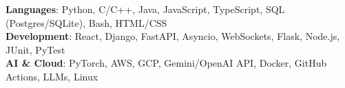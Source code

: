 \begin{itemize}[leftmargin=0.15in, label={}]
    \small{\item{
     \textbf{Languages}{: Python, C/C++, Java, JavaScript, TypeScript, SQL (Postgres/SQLite), Bash, HTML/CSS} \\
     \textbf{Development}{: React, Django, FastAPI, Asyncio, WebSockets, Flask, Node.js, JUnit, PyTest} \\
     \textbf{AI \& Cloud}{: PyTorch, AWS, GCP, Gemini/OpenAI API, Docker, GitHub Actions, LLMs, Linux}
    }}
\end{itemize}
